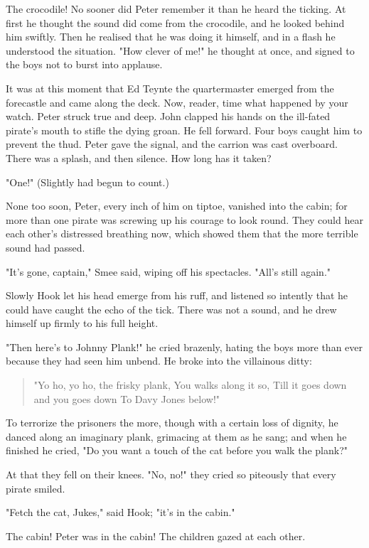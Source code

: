 The crocodile! No sooner did Peter remember it than he heard the ticking.
At first he thought the sound did come from the crocodile, and he looked
behind him swiftly. Then he realised that he was doing it himself, and in
a flash he understood the situation. "How clever of me!" he thought at
once, and signed to the boys not to burst into applause.


It was at this moment that Ed Teynte the quartermaster emerged from the
forecastle and came along the deck. Now, reader, time what happened by
your watch. Peter struck true and deep. John clapped his hands on the
ill-fated pirate's mouth to stifle the dying groan. He fell forward. Four
boys caught him to prevent the thud. Peter gave the signal, and the
carrion was cast overboard. There was a splash, and then silence. How long
has it taken?


"One!" (Slightly had begun to count.)


None too soon, Peter, every inch of him on tiptoe, vanished into the
cabin; for more than one pirate was screwing up his courage to look round.
They could hear each other's distressed breathing now, which showed them
that the more terrible sound had passed.


"It's gone, captain," Smee said, wiping off his spectacles. "All's still
again."


Slowly Hook let his head emerge from his ruff, and listened so intently
that he could have caught the echo of the tick. There was not a sound, and
he drew himself up firmly to his full height.


"Then here's to Johnny Plank!" he cried brazenly, hating the boys more
than ever because they had seen him unbend. He broke into the villainous
ditty:

\begin{verse}
     "Yo ho, yo ho, the frisky plank,
     You walks along it so,
     Till it goes down and you goes down
     To Davy Jones below!"
\end{verse}

To terrorize the prisoners the more, though with a certain loss of
dignity, he danced along an imaginary plank, grimacing at them as he sang;
and when he finished he cried, "Do you want a touch of the cat before you walk the plank?"


At that they fell on their knees. "No, no!" they cried so piteously that
every pirate smiled.


"Fetch the cat, Jukes," said Hook; "it's in the cabin."


The cabin! Peter was in the cabin! The children gazed at each other.


